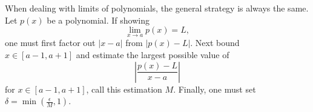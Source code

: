 \documentclass{ximera}
\begin{document}
When dealing with limits of polynomials, the general strategy is
always the same. Let $p(x)$ be a polynomial. If showing
\[
\lim_{x\to a} p(x) = L,
\]
one must first factor out $|x-a|$ from $|p(x) - L|$. Next bound $x\in
[a-1,a+1]$ and estimate the largest possible value of
\[
\left|\frac{p(x) -L}{x-a}\right|
\]
for $x\in[a-1,a+1]$, call this estimation $M$. Finally, one must set
$\delta = \min\left(\frac{\epsilon}{M}, 1\right)$.

\end{document}
